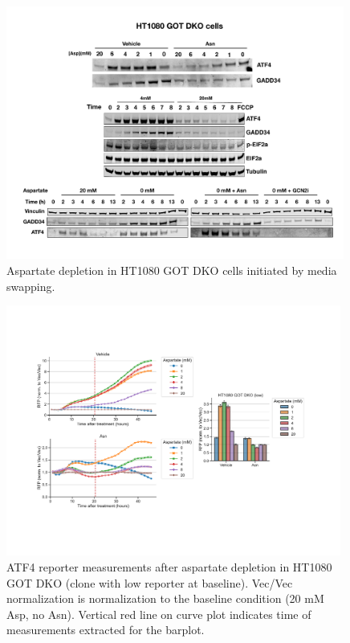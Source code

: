 \begin{figure}[t]
    \centering
    \includegraphics[width=0.99\textwidth]{figures/sapp/ISR/HT1080_DKO_ISR.pdf}
    \caption[Asp depl. induced ISR, HT1080 western]{
    Aspartate depletion in HT1080 GOT DKO cells initiated by media swapping.
    }
    \label{fig:sapp:ISR:HT1080_DKO_ISR}
\end{figure}

\begin{figure}[t]
    \centering
    \includegraphics[width=0.98\textwidth]{figures/sapp/ISR/HT1080_DKO_ASPtit_time.pdf}
    \caption[Asp depl. induced ISR, HT1080 ATF4 reporter]{
    ATF4 reporter measurements after aspartate depletion in HT1080 GOT DKO (clone with low reporter at baseline).
    Vec/Vec normalization is normalization to the baseline condition (20 mM Asp, no Asn).
    Vertical red line on curve plot indicates time of measurements extracted for the barplot.
    }
    \label{fig:sapp:ISR:HT1080_DKO_ASPtit_time}
\end{figure}

